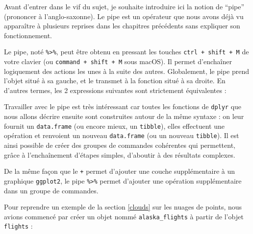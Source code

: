 \documentclass[
  a4paper,
]{article}
\newenvironment{Shaded}{\begin{snugshade}}{\end{snugshade}}
\newcommand{\CommentTok}[1]{\textcolor[rgb]{0.54,0.53,0.53}{#1}}
\newcommand{\KeywordTok}[1]{\textcolor[rgb]{0.12,0.11,0.11}{\textbf{#1}}}
\newcommand{\NormalTok}[1]{\textcolor[rgb]{0.12,0.11,0.11}{#1}}
\newcommand{\OperatorTok}[1]{\textcolor[rgb]{0.12,0.11,0.11}{#1}}
\newcommand{\StringTok}[1]{\textcolor[rgb]{0.75,0.01,0.01}{#1}}
\begin{document}
Avant d'entrer dans le vif du sujet, je souhaite introduire ici la notion de ``pipe'' (prononcer à l'anglo-saxonne). Le pipe est un opérateur que nous avons déjà vu apparaître à plusieurs reprises dans les chapitres précédents sans expliquer son fonctionnement.

Le pipe, noté \texttt{\%\textgreater{}\%}, peut être obtenu en pressant les touches \texttt{ctrl\ +\ shift\ +\ M} de votre clavier (ou \texttt{command\ +\ shift\ +\ M} sous macOS). Il permet d'enchaîner logiquement des actions les unes à la suite des autres. Globalement, le pipe prend l'objet situé à sa gauche, et le transmet à la fonction situé à sa droite. En d'autres termes, les 2 expressions suivantes sont strictement équivalentes :

\begin{Shaded}
\end{Shaded}

Travailler avec le pipe est très intéressant car toutes les fonctions de \texttt{dplyr} que nous allons décrire ensuite sont construites autour de la même syntaxe : on leur fournit un \texttt{data.frame} (ou encore mieux, un \texttt{tibble}), elles effectuent une opération et renvoient un nouveau \texttt{data.frame} (ou un nouveau \texttt{tibble}). Il est ainsi possible de créer des groupes de commandes cohérentes qui permettent, grâce à l'enchaînement d'étapes simples, d'aboutir à des résultats complexes.

De la même façon que le \texttt{+} permet d'ajouter une couche supplémentaire à un graphique \texttt{ggplot2}, le pipe \texttt{\%\textgreater{}\%} permet d'ajouter une opération supplémentaire dans un groupe de commandes.

Pour reprendre un exemple de la section \ref{clouds} sur les nuages de points, nous avions commencé par créer un objet nommé \texttt{alaska\_flights} à partir de l'objet \texttt{flights} :

\begin{Shaded}
\end{Shaded}
\end{document}
